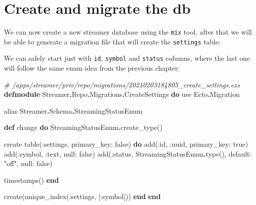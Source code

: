 \documentclass[
]{book}
\newenvironment{Shaded}{\begin{snugshade}}{\end{snugshade}}
\newcommand{\AttributeTok}[1]{\textcolor[rgb]{0.77,0.63,0.00}{#1}}
\newcommand{\CommentTok}[1]{\textcolor[rgb]{0.56,0.35,0.01}{\textit{#1}}}
\newcommand{\ConstantTok}[1]{\textcolor[rgb]{0.00,0.00,0.00}{#1}}
\newcommand{\ExtensionTok}[1]{#1}
\newcommand{\ImportTok}[1]{#1}
\newcommand{\KeywordTok}[1]{\textcolor[rgb]{0.13,0.29,0.53}{\textbf{#1}}}
\newcommand{\NormalTok}[1]{#1}
\newcommand{\OperatorTok}[1]{\textcolor[rgb]{0.81,0.36,0.00}{\textbf{#1}}}
\newcommand{\StringTok}[1]{\textcolor[rgb]{0.31,0.60,0.02}{#1}}
\newcommand{\VariableTok}[1]{\textcolor[rgb]{0.00,0.00,0.00}{#1}}
\begin{document}
\hypertarget{create-and-migrate-the-db-1}{%
\section{Create and migrate the db}\label{create-and-migrate-the-db-1}}

We can now create a new streamer database using the \texttt{mix} tool, after that we will be able to generate a migration file that will create the \texttt{settings} table:

\begin{Shaded}
\end{Shaded}

We can safely start just with \texttt{id}, \texttt{symbol} and \texttt{status} columns, where the last one will follow the same enum idea from the previous chapter:

\begin{Shaded}
\begin{Highlighting}[]
\CommentTok{\# /apps/streamer/priv/repo/migrations/20210203184805\_create\_settings.exs}
\KeywordTok{defmodule} \ConstantTok{Streamer}\OperatorTok{.}\ConstantTok{Repo}\OperatorTok{.}\ConstantTok{Migrations}\OperatorTok{.}\ConstantTok{CreateSettings} \KeywordTok{do}
  \ImportTok{use} \ConstantTok{Ecto}\OperatorTok{.}\ConstantTok{Migration}

  \ImportTok{alias} \ConstantTok{Streamer}\OperatorTok{.}\ConstantTok{Schema}\OperatorTok{.}\ConstantTok{StreamingStatusEnum}

  \KeywordTok{def}\NormalTok{ change }\KeywordTok{do}
    \ConstantTok{StreamingStatusEnum}\OperatorTok{.}\NormalTok{create\_type()}

\NormalTok{    create table(}\VariableTok{:settings}\NormalTok{, }\VariableTok{primary\_key:} \ConstantTok{false}\NormalTok{) }\KeywordTok{do}
\NormalTok{      add(}\VariableTok{:id}\NormalTok{, }\VariableTok{:uuid}\NormalTok{, }\VariableTok{primary\_key:} \ConstantTok{true}\NormalTok{)}
\NormalTok{      add(}\VariableTok{:symbol}\NormalTok{, }\VariableTok{:text}\NormalTok{, }\VariableTok{null:} \ConstantTok{false}\NormalTok{)}
\NormalTok{      add(}\VariableTok{:status}\NormalTok{, }\ConstantTok{StreamingStatusEnum}\OperatorTok{.}\NormalTok{type(), }\VariableTok{default:} \StringTok{"off"}\NormalTok{, }\VariableTok{null:} \ConstantTok{false}\NormalTok{)}
      
\NormalTok{      timestamps()}
    \KeywordTok{end}

\NormalTok{    create(unique\_index(}\VariableTok{:settings}\NormalTok{, [}\VariableTok{:symbol}\NormalTok{]))}
  \KeywordTok{end}
\KeywordTok{end}
\end{Highlighting}
\end{Shaded}
\end{document}
